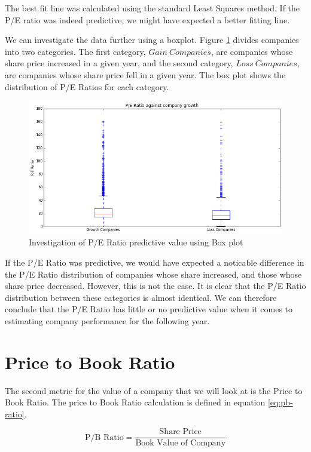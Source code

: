 \documentclass{report}
\begin{document}
The best fit line was calculated using the standard Least Squares method. If the P/E ratio was indeed predictive, we might have expected a better fitting line.

We can investigate the data further using a boxplot. Figure \ref{fig:pe-box} divides companies into two categories. The first category, $Gain\ Companies$, are companies whose share price increased in a given year, and the second category, $Loss\ Companies$, are companies whose share price fell in a given year. The box plot shows the distribution of P/E Ratios for each category.

\begin{figure}[H]
	\caption{Investigation of P/E Ratio predictive value using Box plot}
	\centerline{\includegraphics[width=\textwidth]{vis/pe_box.png}}
	\label{fig:pe-box}
\end{figure}

If the P/E Ratio was predictive, we would have expected a noticable difference in the P/E Ratio distribution of companies whose share increased, and those whose share price decreased. However, this is not the case. It is clear that the P/E Ratio distribution between these categories is almost identical. We can therefore conclude that the P/E Ratio has little or no predictive value when it comes to estimating company performance for the following year.

\section{Price to Book Ratio}

The second metric for the value of a company that we will look at is the Price to Book Ratio. The price to Book Ratio calculation is defined in equation \ref{eq:pb-ratio}.

\begin{center}
\begin{equation}
  \text{P/B Ratio} = \dfrac{\text{Share Price}}{\text{Book Value of Company}}
\end{equation}
\label{eq:pb-ratio}  
\end{center}
\end{document}
